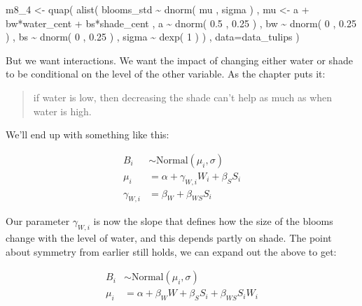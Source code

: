 \documentclass[
]{book}
\newenvironment{Shaded}{\begin{snugshade}}{\end{snugshade}}
\newcommand{\AttributeTok}[1]{\textcolor[rgb]{0.77,0.63,0.00}{#1}}
\newcommand{\DecValTok}[1]{\textcolor[rgb]{0.00,0.00,0.81}{#1}}
\newcommand{\FloatTok}[1]{\textcolor[rgb]{0.00,0.00,0.81}{#1}}
\newcommand{\FunctionTok}[1]{\textcolor[rgb]{0.00,0.00,0.00}{#1}}
\newcommand{\NormalTok}[1]{#1}
\newcommand{\OtherTok}[1]{\textcolor[rgb]{0.56,0.35,0.01}{#1}}
\newcommand{\SpecialCharTok}[1]{\textcolor[rgb]{0.00,0.00,0.00}{#1}}
\begin{document}
\begin{Shaded}
\begin{Highlighting}[]
\NormalTok{m8\_4 }\OtherTok{\textless{}{-}} \FunctionTok{quap}\NormalTok{( }\FunctionTok{alist}\NormalTok{(}
\NormalTok{blooms\_std }\SpecialCharTok{\textasciitilde{}} \FunctionTok{dnorm}\NormalTok{( mu , sigma ) , }
\NormalTok{mu }\OtherTok{\textless{}{-}}\NormalTok{ a }\SpecialCharTok{+}\NormalTok{ bw}\SpecialCharTok{*}\NormalTok{water\_cent }\SpecialCharTok{+}\NormalTok{ bs}\SpecialCharTok{*}\NormalTok{shade\_cent , }
\NormalTok{a }\SpecialCharTok{\textasciitilde{}} \FunctionTok{dnorm}\NormalTok{( }\FloatTok{0.5}\NormalTok{ , }\FloatTok{0.25}\NormalTok{ ) , }
\NormalTok{bw }\SpecialCharTok{\textasciitilde{}} \FunctionTok{dnorm}\NormalTok{( }\DecValTok{0}\NormalTok{ , }\FloatTok{0.25}\NormalTok{ ) , }
\NormalTok{bs }\SpecialCharTok{\textasciitilde{}} \FunctionTok{dnorm}\NormalTok{( }\DecValTok{0}\NormalTok{ , }\FloatTok{0.25}\NormalTok{ ) , }
\NormalTok{sigma }\SpecialCharTok{\textasciitilde{}} \FunctionTok{dexp}\NormalTok{( }\DecValTok{1}\NormalTok{ )}
\NormalTok{) , }\AttributeTok{data=}\NormalTok{data\_tulips )}
\end{Highlighting}
\end{Shaded}

But we want interactions. We want the impact of changing either water or shade to be conditional on the level of the other variable. As the chapter puts it:

\begin{quote}
if water is low, then decreasing the shade can't help as much as when water is high.
\end{quote}

We'll end up with something like this:

\[
\begin{aligned}
B_i &\sim \text{Normal}(\mu_i,\sigma) \\
\mu_i &= \alpha + \gamma_{W,i}W_i + \beta_SS_i \\
\gamma_{W,i} & = \beta_W + \beta_{WS}S_i
\end{aligned}
\]

Our parameter \(\gamma_{W,i}\) is now the slope that defines how the size of the blooms change with the level of water, and this depends partly on shade. The point about symmetry from earlier still holds, we can expand out the above to get:

\[
\begin{aligned}
B_i &\sim \text{Normal}(\mu_i,\sigma) \\
\mu_i &= \alpha + \beta_W W  + \beta_SS_i + \beta_{WS}S_iW_i\\
\end{aligned}
\]
\end{document}
